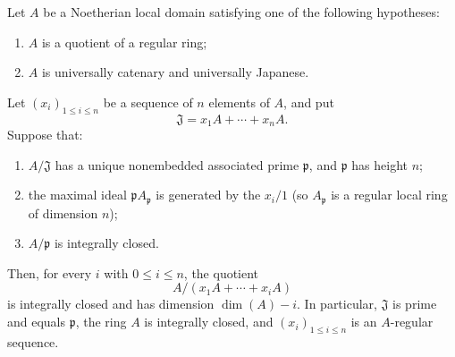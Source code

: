\begin{corollary}[5.12.10]
\label{IV.5.12.10}
Let $A$ be a Noetherian local domain satisfying one of the
following hypotheses:
\begin{enumerate}[{\rm a)}]
  \item $A$ is a quotient of a regular ring;
  \item $A$ is universally catenary and universally Japanese.
\end{enumerate}
Let $(x_i)_{1\leq i\leq n}$ be a sequence of $n$ elements of
$A$, and put
\[
  \mathfrak J=x_1A+\cdots+x_nA.
\]
Suppose that:
\begin{enumerate}[{\rm(i)}]
  \item $A/\mathfrak J$ has a unique nonembedded associated
  prime $\mathfrak p$, and $\mathfrak p$ has height $n$;
  \item the maximal ideal $\mathfrak pA_{\mathfrak p}$ is
  generated by the $x_i/1$ (so $A_{\mathfrak p}$ is a regular
  local ring of dimension $n$);
  \item $A/\mathfrak p$ is integrally closed.
\end{enumerate}
Then, for every $i$ with $0\leq i\leq n$, the quotient
\[
  A/(x_1A+\cdots+x_iA)
\]
is integrally closed and has dimension $\dim(A)-i$.  In
particular, $\mathfrak J$ is prime and equals $\mathfrak p$, the
ring $A$ is integrally closed, and $(x_i)_{1\leq i\leq n}$ is an
$A$-regular sequence.
\end{corollary}

